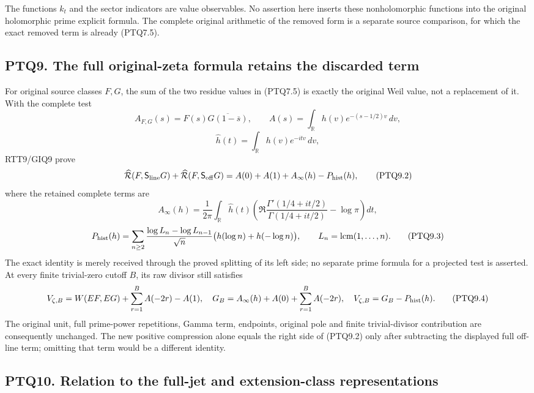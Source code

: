 The functions \(k_t\) and the sector indicators are value observables.
No assertion here inserts these nonholomorphic functions into the
original holomorphic prime explicit formula. The complete original
arithmetic of the removed form is a separate source comparison, for
which the exact removed term is already (PTQ7.5).

\subsection{PTQ9. The full original-zeta formula retains the discarded
term}\label{ptq9.-the-full-original-zeta-formula-retains-the-discarded-term}

For original source classes \(F,G\), the sum of the two residue values
in (PTQ7.5) is exactly the original Weil value, not a replacement of it.
With the complete test \[
A_{F,G}(s)=F(s)\overline{G(1-\overline s)},\qquad
A(s)=\int_{\mathbb R}h(v)e^{-(s-1/2)v}\,dv,
\] \[
\widehat h(t)=\int_{\mathbb R}h(v)e^{-itv}\,dv,
\tag{PTQ9.1}
\] RTT9/GIQ9 prove \[
\widehat{\mathcal R}(F,\mathsf S_{\rm line}G)
+\widehat{\mathcal R}(F,\mathsf S_{\rm off}G)
=A(0)+A(1)+A_\infty(h)-P_{\rm hist}(h),
\tag{PTQ9.2}
\] where the retained complete terms are \[
A_\infty(h)=\frac1{2\pi}\int_{\mathbb R}\widehat h(t)
\left(\Re\frac{\Gamma'(1/4+it/2)}{\Gamma(1/4+it/2)}-\log\pi\right)dt,
\] \[
P_{\rm hist}(h)=\sum_{n\ge2}\frac{\log L_n-\log L_{n-1}}{\sqrt n}
\bigl(h(\log n)+h(-\log n)\bigr),\qquad
L_n=\operatorname{lcm}(1,\ldots,n).
\tag{PTQ9.3}
\] The exact identity is merely received through the proved splitting of
its left side; no separate prime formula for a projected test is
asserted. At every finite trivial-zero cutoff \(B\), its raw divisor
still satisfies \[
V_{\zeta,B}=W(EF,EG)+\sum_{r=1}^B A(-2r)-A(1),
\quad G_B=A_\infty(h)+A(0)+\sum_{r=1}^B A(-2r),
\quad V_{\zeta,B}=G_B-P_{\rm hist}(h).
\tag{PTQ9.4}
\] The original unit, full prime-power repetitions, Gamma term,
endpoints, original pole and finite trivial-divisor contribution are
consequently unchanged. The new positive compression alone equals the
right side of (PTQ9.2) only after subtracting the displayed full
off-line term; omitting that term would be a different identity.

\subsection{PTQ10. Relation to the full-jet and extension-class
representations}\label{ptq10.-relation-to-the-full-jet-and-extension-class-representations}

